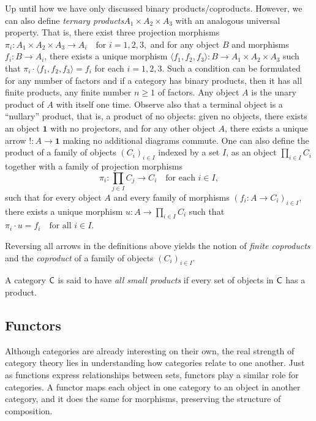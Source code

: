 Up until how we have only discussed binary products/coproducts. However, we can also define \emph{ternary products}\(A_1 \times A_2 \times A_3\) with an analogous universal property. That is, there exist three projection morphisms
$\pi_i : A_1 \times A_2 \times A_3 \to A_i \quad \text{for } i = 1, 2, 3,$
and for any object \(B\) and morphisms \(f_i : B \to A_i\), there exists a unique morphism 
$\langle f_1, f_2, f_3 \rangle  : B \to A_1 \times A_2 \times A_3$ 
such that \(\pi_i \cdot \langle f_1, f_2, f_3 \rangle = f_i\) for each \(i = 1, 2, 3\). Such a condition can be formulated for any number of factors and if a category has binary products, then it has all finite products, \ie any finite number $n \geq 1$ of factors. 
Any object $A$ is the unary product of $A$ with itself one time. Observe also that a terminal object is a ``nullary'' product, that is, a product of no objects: given no objects, there exists an object $\mathbf{1}$ with no projectors, and for any other object $A$, there exists a unique arrow $!: A \to \mathbf{1}$ making no additional diagrams commute. One can also define the product of a family of objects \((C_i)_{i \in I}\) indexed by a set \(I\), as an object $\prod_{i \in I} C_i$
together with a family of projection morphisms
\[
\pi_i : \prod_{j \in I} C_j \to C_i \quad \text{for each } i \in I,
\]
such that for every object \(A\) and every family of morphisms \((f_i : A \to C_i)_{i \in I}\), there exists a unique morphism $u : A \to \prod_{i \in I} C_i$ such that $\pi_i \cdot u = f_i \quad \text{for all } i \in I$.
 
Reversing all arrows in the definitions above yields the notion of \emph{finite coproducts} and the \emph{coproduct} of a family of objects $(C_i)_{i \in I}$.

\begin{definition}
A category \(\mathsf{C}\) is said to have \emph{all small products} if every  set of objects in \(\mathsf{C}\) has a product.
\end{definition}



\subsection{Functors}
  

Although categories are already interesting on their own, the real strength of category theory lies in understanding how categories relate to one another. Just as functions express relationships between sets, functors play a similar role for categories. A functor maps each object in one category to an object in another category, and it does the same for morphisms, preserving the structure of composition.


